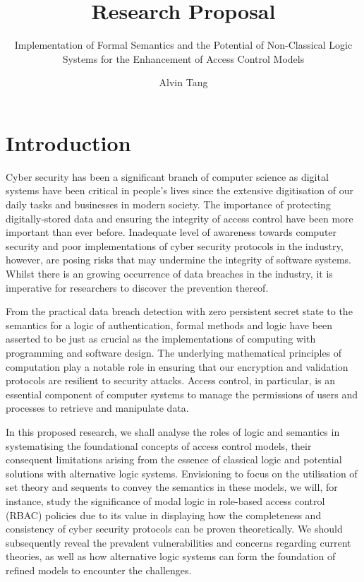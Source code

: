 \documentclass{article}
\title{Research Proposal}
\subtitle{Implementation of Formal Semantics and the Potential of Non-Classical
Logic Systems for the Enhancement of Access Control Models}
\author{Alvin Tang}
\date{}
\begin{document}
\maketitle

\section*{Introduction}

Cyber security has been a significant branch of computer science as
digital systems have been critical in people's lives since the extensive
digitisation of our daily tasks and businesses in modern society. The
importance of protecting digitally-stored data and ensuring the integrity
of access control have been more important than ever before. Inadequate
level of awareness towards computer security and poor implementations of
cyber security protocols in the industry, however, are posing risks that
may undermine the integrity of software systems. Whilst there is an growing
occurrence of data breaches in the industry, it is imperative for researchers
to discover the prevention thereof.\cite{cyber-security}

From the practical data breach detection with zero persistent
secret state\cite{zero-persistent} to the semantics for a logic of
authentication\cite{logic-semantics}, formal methods and logic have been
asserted to be just as crucial as the implementations of computing with
programming and software design. The underlying mathematical principles of
computation play a notable role in ensuring that our encryption and validation
protocols are resilient to security attacks. Access control, in particular,
is an essential component of computer systems to manage the permissions of
users and processes to retrieve and manipulate data.

In this proposed research, we shall analyse the roles of logic and semantics
in systematising the foundational concepts of access control models, their
consequent limitations arising from the essence of classical logic and
potential solutions with alternative logic systems. Envisioning to focus
on the utilisation of set theory and sequents to convey the semantics in
these models, we will, for instance, study the significance of modal logic
in role-based access control (RBAC) policies due to its value in displaying
how the completeness and consistency of cyber security protocols can be
proven theoretically.\cite{modal-logic} We should subsequently reveal the
prevalent vulnerabilities and concerns regarding current theories, as well
as how alternative logic systems can form the foundation of refined models
to encounter the challenges.
\end{document}
